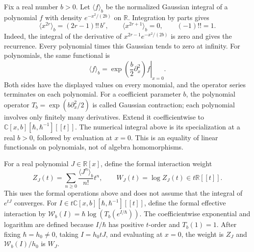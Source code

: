 Fix a real number $b>0$. Let $\langle f\rangle_b$ be the normalized
Gaussian integral of a polynomial $f$ with density
$e^{-x^2/(2b)}$ on $\mathbb R$. Integration by parts gives
\[
 \langle x^{2r}\rangle_b=(2r-1)!!\,b^r,\qquad
 \langle x^{2r+1}\rangle_b=0,
 \qquad (-1)!!=1.
\]
Indeed, the integral of the derivative of
$x^{2r-1}e^{-x^2/(2b)}$ is zero and gives the recurrence.
Every polynomial times this Gaussian tends to zero at infinity.
For polynomials, the same functional is
\[
 \langle f\rangle_b=
 \left.\exp\!\left(\frac b2\partial_x^2\right)f\right|_{x=0}.
\]
Both sides have the displayed values on every monomial, and the
operator series terminates on each polynomial.
For a coefficient parameter $b$, the polynomial operator
$T_b=\exp(b\partial_x^2/2)$ is called Gaussian contraction; each
polynomial involves only finitely many derivatives. Extend it
coefficientwise to $\mathbb C[x,b][\hbar,\hbar^{-1}][[t]]$.
The numerical integral above is its specialization at a real $b>0$,
followed by evaluation at $x=0$. This is an equality of linear
functionals on polynomials, not of algebra homomorphisms.

For a real polynomial $J\in\mathbb R[x]$, define the formal interaction weight
\[
 Z_J(t)=\sum_{n\geq0}\frac{\langle J^n\rangle_b}{n!}t^n,
 \qquad W_J(t)=\log Z_J(t)\in t\mathbb R[[t]].
\]
This uses the formal operations above and does not assume that the
integral of $e^{tJ}$ converges.
For $I\in t\mathbb C[x,b][\hbar,\hbar^{-1}][[t]]$, define the
formal effective interaction by
$\mathcal W_b(I)=\hbar\log(T_b(e^{I/\hbar}))$.
The coefficientwise exponential and logarithm are defined because
$I/\hbar$ has positive $t$-order and $T_b(1)=1$.
After fixing $\hbar=h_0\ne0$, taking $I=h_0tJ$, and evaluating
at $x=0$, the weight is $Z_J$ and $\mathcal W_b(I)/h_0$ is $W_J$.

